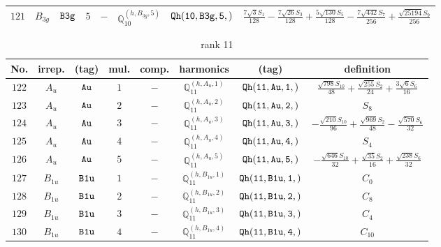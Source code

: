 \documentclass[fleqn,8pt]{jsarticle}
\begin{document}
\begin{table}[ht!]
\begin{center}
\begin{tabular}{cccccccc}
$ 121 $ & $ B_{3g} $ & $ {\tt B3g} $ & $ 5 $ & $ - $ & $ \mathbb{Q}_{10}^{(h,B_{3g},5)} $ & $ {\tt Qh(10,B3g,5,)} $ & $ \frac{7 \sqrt{3} S_{1}}{128} - \frac{7 \sqrt{26} S_{3}}{128} + \frac{5 \sqrt{130} S_{5}}{128} - \frac{7 \sqrt{442} S_{7}}{256} + \frac{\sqrt{25194} S_{9}}{256} $ \\
 \hline \hline
\end{tabular}
\end{center}
\end{table}
\begin{table}[ht!]
\begin{center}
\caption{rank 11}
\renewcommand{\arraystretch}{1.3}
\begin{tabular}{cccccccc} \hline \hline
No. & irrep. & (tag) & mul. & comp. & harmonics & (tag) & definition \\ \hline
$ 122 $ & $ A_{u} $ & $ {\tt Au} $ & $ 1 $ & $ - $ & $ \mathbb{Q}_{11}^{(h,A_{u},1)} $ & $ {\tt Qh(11,Au,1,)} $ & $ \frac{\sqrt{798} S_{10}}{48} + \frac{\sqrt{255} S_{2}}{24} + \frac{3 \sqrt{6} S_{6}}{16} $ \\
$ 123 $ & $ A_{u} $ & $ {\tt Au} $ & $ 2 $ & $ - $ & $ \mathbb{Q}_{11}^{(h,A_{u},2)} $ & $ {\tt Qh(11,Au,2,)} $ & $ S_{8} $ \\
$ 124 $ & $ A_{u} $ & $ {\tt Au} $ & $ 3 $ & $ - $ & $ \mathbb{Q}_{11}^{(h,A_{u},3)} $ & $ {\tt Qh(11,Au,3,)} $ & $ - \frac{\sqrt{210} S_{10}}{96} + \frac{\sqrt{969} S_{2}}{48} - \frac{\sqrt{570} S_{6}}{32} $ \\
$ 125 $ & $ A_{u} $ & $ {\tt Au} $ & $ 4 $ & $ - $ & $ \mathbb{Q}_{11}^{(h,A_{u},4)} $ & $ {\tt Qh(11,Au,4,)} $ & $ S_{4} $ \\
$ 126 $ & $ A_{u} $ & $ {\tt Au} $ & $ 5 $ & $ - $ & $ \mathbb{Q}_{11}^{(h,A_{u},5)} $ & $ {\tt Qh(11,Au,5,)} $ & $ - \frac{\sqrt{646} S_{10}}{32} + \frac{\sqrt{35} S_{2}}{16} + \frac{\sqrt{238} S_{6}}{32} $ \\
$ 127 $ & $ B_{1u} $ & $ {\tt B1u} $ & $ 1 $ & $ - $ & $ \mathbb{Q}_{11}^{(h,B_{1u},1)} $ & $ {\tt Qh(11,B1u,1,)} $ & $ C_{0} $ \\
$ 128 $ & $ B_{1u} $ & $ {\tt B1u} $ & $ 2 $ & $ - $ & $ \mathbb{Q}_{11}^{(h,B_{1u},2)} $ & $ {\tt Qh(11,B1u,2,)} $ & $ C_{8} $ \\
$ 129 $ & $ B_{1u} $ & $ {\tt B1u} $ & $ 3 $ & $ - $ & $ \mathbb{Q}_{11}^{(h,B_{1u},3)} $ & $ {\tt Qh(11,B1u,3,)} $ & $ C_{4} $ \\
$ 130 $ & $ B_{1u} $ & $ {\tt B1u} $ & $ 4 $ & $ - $ & $ \mathbb{Q}_{11}^{(h,B_{1u},4)} $ & $ {\tt Qh(11,B1u,4,)} $ & $ C_{10} $ \\

\end{tabular}
\end{center}
\end{table}
\end{document}
